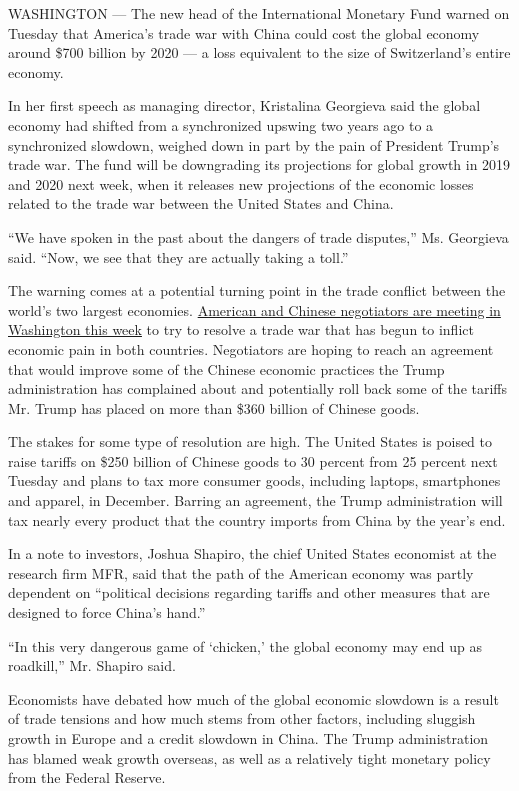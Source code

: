 WASHINGTON --- The new head of the International Monetary Fund warned on
Tuesday that America's trade war with China could cost the global
economy around \$700 billion by 2020 --- a loss equivalent to the size
of Switzerland's entire economy.

In her first speech as managing director, Kristalina Georgieva said the
global economy had shifted from a synchronized upswing two years ago to
a synchronized slowdown, weighed down in part by the pain of President
Trump's trade war. The fund will be downgrading its projections for
global growth in 2019 and 2020 next week, when it releases new
projections of the economic losses related to the trade war between the
United States and China.

``We have spoken in the past about the dangers of trade disputes,'' Ms.
Georgieva said. ``Now, we see that they are actually taking a toll.''

The warning comes at a potential turning point in the trade conflict
between the world's two largest economies.
\href{https://www.nytimes.com/2019/09/21/business/united-states-china-trade.html}{American
and Chinese negotiators are meeting in Washington this week} to try to
resolve a trade war that has begun to inflict economic pain in both
countries. Negotiators are hoping to reach an agreement that would
improve some of the Chinese economic practices the Trump administration
has complained about and potentially roll back some of the tariffs Mr.
Trump has placed on more than \$360 billion of Chinese goods.

The stakes for some type of resolution are high. The United States is
poised to raise tariffs on \$250 billion of Chinese goods to 30 percent
from 25 percent next Tuesday and plans to tax more consumer goods,
including laptops, smartphones and apparel, in December. Barring an
agreement, the Trump administration will tax nearly every product that
the country imports from China by the year's end.

In a note to investors, Joshua Shapiro, the chief United States
economist at the research firm MFR, said that the path of the American
economy was partly dependent on ``political decisions regarding tariffs
and other measures that are designed to force China's hand.''

``In this very dangerous game of `chicken,' the global economy may end
up as roadkill,'' Mr. Shapiro said.

Economists have debated how much of the global economic slowdown is a
result of trade tensions and how much stems from other factors,
including sluggish growth in Europe and a credit slowdown in China. The
Trump administration has blamed weak growth overseas, as well as a
relatively tight monetary policy from the Federal Reserve.

